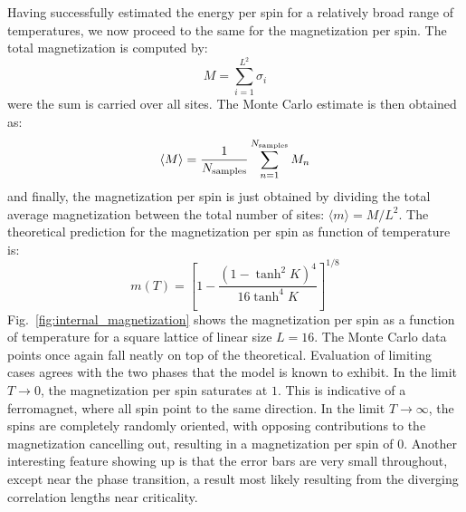 \documentclass[12pt]{article}
\newcommand{\figref}[1]{Fig.~\ref{#1}}
\begin{document}
Having successfully estimated the energy per spin for a relatively broad range of temperatures, we now proceed to the same for the magnetization per spin. The total magnetization is computed by: 
%
\begin{equation}
M = \sum_{i=1}^{L^2} \sigma_i
\end{equation}
%
were the sum is carried over all sites. The Monte Carlo estimate is then obtained as:
%
\begin{equation}
\langle M \rangle = \frac{1}{N_{\rm{samples}}} \sum_{n=1}^{N_{\rm{samples}}} M_n
\end{equation}
%
and finally, the magnetization per spin is just obtained by dividing the total average magnetization between the total number of sites: $\langle m \rangle = M/L^2$. The theoretical prediction for the magnetization per spin as function of temperature is:
%
\begin{equation}
m(T) = [1 - \frac{(1-\tanh^2K)^4}{16 \tanh^4K}]^{1/8}
\end{equation}
%
\figref{fig:internal_magnetization} shows the magnetization per spin as a function of temperature for a square lattice of linear size $L=16$. The Monte Carlo data points once again fall neatly on top of the theoretical. Evaluation of limiting cases agrees with the two phases that the model is known to exhibit. In the limit $T\to0$, the magnetization per spin saturates at $1$. This is indicative of a ferromagnet, where all spin point to the same direction. In the limit $T\to\infty$, the spins are completely randomly oriented, with opposing contributions to the magnetization cancelling out, resulting in a magnetization per spin of $0$. Another interesting feature showing up is that the error bars are very small throughout, except near the phase transition, a result most likely resulting from the diverging correlation lengths near criticality.
\end{document}
